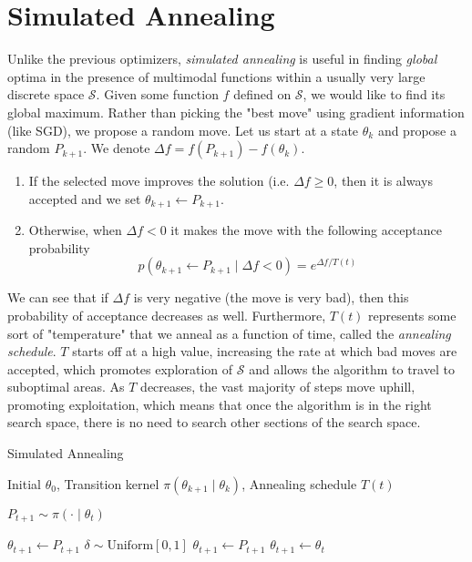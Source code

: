 \section{Simulated Annealing}

  Unlike the previous optimizers, \textit{simulated annealing} is useful in finding \textit{global} optima in the presence of multimodal functions within a usually very large discrete space $\mathcal{S}$. Given some function $f$ defined on $\mathcal{S}$, we would like to find its global maximum. Rather than picking the "best move" using gradient information (like SGD), we propose a random move. Let us start at a state $\theta_k$ and propose a random $P_{k+1}$. We denote $\Delta f = f(P_{k+1}) - f(\theta_k)$. 
  \begin{enumerate}
      \item If the selected move improves the solution (i.e. $\Delta f \geq 0$, then it is always accepted and we set $\theta_{k+1} \gets P_{k+1}$. 
      \item Otherwise, when $\Delta f < 0$ it makes the move with the following acceptance probability 
      \[p(\theta_{k+1} \gets P_{k+1} \mid \Delta f < 0) = e^{\Delta f / T(t)}\]
  \end{enumerate}
  We can see that if $\Delta f$ is very negative (the move is very bad), then this probability of acceptance decreases as well. Furthermore, $T(t)$ represents some sort of "temperature" that we anneal as a function of time, called the \textit{annealing schedule}. $T$ starts off at a high value, increasing the rate at which bad moves are accepted, which promotes exploration of $\mathcal{S}$ and allows the algorithm to travel to suboptimal areas. As $T$ decreases, the vast majority of steps move uphill, promoting exploitation, which means that once the algorithm is in the right search space, there is no need to search other sections of the search space. 

  \begin{algorithm}
  \caption{Simulated Annealing}\label{alg:sim_anneal}
  \begin{algorithmic}

  \Require Initial $\theta_0$, Transition kernel $\pi(\theta_{k+1} \mid \theta_k)$, Annealing schedule $T(t)$

      \State $P_{t+1} \sim \pi( \cdot \mid \theta_t)$
      
          \State $\theta_{t+1} \gets P_{t+1}$ 
      \Else 
          \State $\delta \sim \mathrm{Uniform}[0, 1]$
          \If{$\delta < \exp[(f(P_{t+1}) - f(\theta_t))/T(t)]$}
              \State $\theta_{t+1} \gets P_{t+1}$ 
          \Else 
              \State $\theta_{t+1} \gets \theta_t$ 
          \EndIf
      \EndIf
  \EndFor

  \end{algorithmic}
  \end{algorithm}

